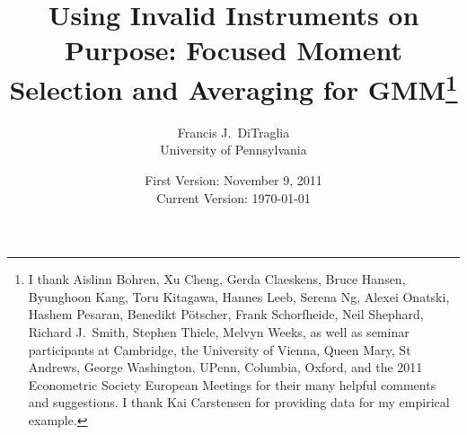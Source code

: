 \documentclass[12pt]{article}
\begin{document}
\title{Using Invalid Instruments on Purpose: Focused Moment Selection and Averaging for GMM\footnote{I thank Aislinn Bohren, Xu Cheng, Gerda Claeskens, Bruce Hansen, Byunghoon Kang, Toru Kitagawa, Hannes Leeb, Serena Ng, Alexei Onatski, Hashem Pesaran, Benedikt P\"{o}tscher, Frank Schorfheide, Neil Shephard, Richard J.\ Smith, Stephen Thiele, Melvyn Weeks, as well as seminar participants at Cambridge, the University of Vienna, Queen Mary, St Andrews, George Washington, UPenn, Columbia, Oxford, and the 2011 Econometric Society European Meetings for their many helpful comments and suggestions. I thank Kai Carstensen for providing data for my empirical example.}}

\author{Francis J.\ DiTraglia \\ University of Pennsylvania}

\date{\footnotesize First Version: November 9, 2011 \\ Current Version: \today}

\maketitle 
\begin{abstract}
	
\end{abstract}
















\appendix


%


\end{document}
